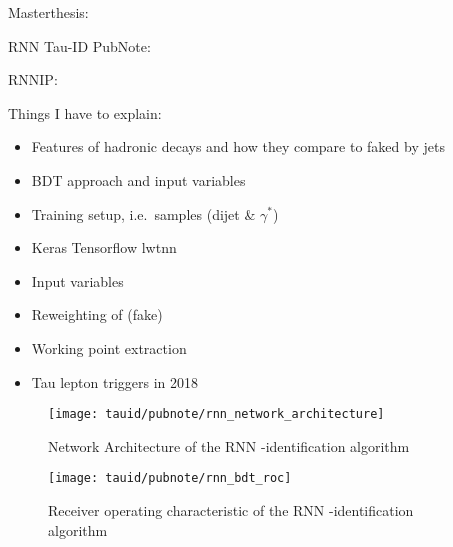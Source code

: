 Masterthesis: \cite{cdeutsch-master}

RNN Tau-ID PubNote: \cite{ATL-PHYS-PUB-2019-033}

RNNIP: \cite{ATL-PHYS-PUB-2017-003}

Things I have to explain:
\begin{itemize}
\item Features of hadronic \tauhad decays and how they compare to \tauhad faked by jets
\item BDT approach and input variables
\item Training setup, i.e.\ samples (dijet \& $\gamma^*$)
\item Keras Tensorflow lwtnn \cite{lwtnn,keras,tensorflow2015-whitepaper,lstm}
\item Input variables
\item Reweighting of (fake) \tauhad \pT
\item Working point extraction
\item Tau lepton triggers in 2018 \cite{ATL-DAQ-PUB-2019-001}
\end{itemize}



\begin{figure}[htbp]
  \centering

  \texttt{[image: tauid/pubnote/rnn\_network\_architecture]}

  \caption{Network Architecture of the RNN \tauhad-identification
    algorithm \cite{ATL-PHYS-PUB-2019-033}}
  \label{fig:tauid_network_architecture}
\end{figure}


\begin{figure}[htbp]
  \centering

  \texttt{[image: tauid/pubnote/rnn\_bdt\_roc]}

  \caption{Receiver operating characteristic of the RNN
    \tauhad-identification algorithm \cite{ATL-PHYS-PUB-2019-033}}
  \label{fig:tauid_rnn_bdt_roc_comparison}
\end{figure}

